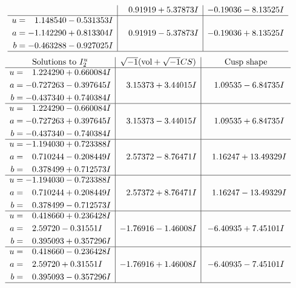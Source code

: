 \documentclass[1p]{elsarticle_modified}
\theoremstyle{definition}
\newcommand{\I}{\sqrt{-1}}
\begin{document}
$$\begin{array}{c|c|c}
 & \phantom{-}0.91919 + 5.37873 I & -0.19036 - 8.13525 I \\ \hline\begin{aligned}
u &= \phantom{-}1.148540 - 0.531353 I \\
a &= -1.142290 + 0.813304 I \\
b &= -0.463288 - 0.927025 I\end{aligned}
 & \phantom{-}0.91919 - 5.37873 I & -0.19036 + 8.13525 I\\
 \hline 
 \end{array}$$\newpage$$\begin{array}{c|c|c}  
\text{Solutions to }I^u_{2}& \I (\text{vol} + \sqrt{-1}CS) & \text{Cusp shape}\\
 \hline 
\begin{aligned}
u &= \phantom{-}1.224290 + 0.660084 I \\
a &= -0.727263 - 0.397645 I \\
b &= -0.437340 + 0.740384 I\end{aligned}
 & \phantom{-}3.15373 + 3.44015 I & \phantom{-}1.09535 - 6.84735 I \\ \hline\begin{aligned}
u &= \phantom{-}1.224290 - 0.660084 I \\
a &= -0.727263 + 0.397645 I \\
b &= -0.437340 - 0.740384 I\end{aligned}
 & \phantom{-}3.15373 - 3.44015 I & \phantom{-}1.09535 + 6.84735 I \\ \hline\begin{aligned}
u &= -1.194030 + 0.723388 I \\
a &= \phantom{-}0.710244 - 0.208449 I \\
b &= \phantom{-}0.378499 + 0.712573 I\end{aligned}
 & \phantom{-}2.57372 - 8.76471 I & \phantom{-}1.16247 + 13.49329 I \\ \hline\begin{aligned}
u &= -1.194030 - 0.723388 I \\
a &= \phantom{-}0.710244 + 0.208449 I \\
b &= \phantom{-}0.378499 - 0.712573 I\end{aligned}
 & \phantom{-}2.57372 + 8.76471 I & \phantom{-}1.16247 - 13.49329 I \\ \hline\begin{aligned}
u &= \phantom{-}0.418660 + 0.236428 I \\
a &= \phantom{-}2.59720 - 0.31551 I \\
b &= \phantom{-}0.395093 + 0.357296 I\end{aligned}
 & -1.76916 - 1.46008 I & -6.40935 + 7.45101 I \\ \hline\begin{aligned}
u &= \phantom{-}0.418660 - 0.236428 I \\
a &= \phantom{-}2.59720 + 0.31551 I \\
b &= \phantom{-}0.395093 - 0.357296 I\end{aligned}
 & -1.76916 + 1.46008 I & -6.40935 - 7.45101 I\\
 \hline 
 \end{array}$$\newpage
\end{document}
